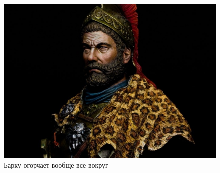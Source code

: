 \begin{figure}[h!tb]
	\centering\includegraphics[scale=0.3]{Data/Hannibal_and_Rome/1622873273198376009.png}
	\caption{Барку огорчает вообще все вокруг	}
	\label{fig:barka4} %
\end{figure}